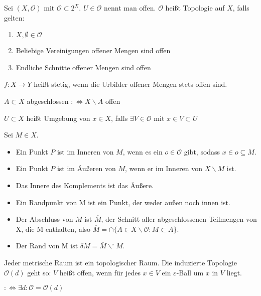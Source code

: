 \begin{defi}[Topologie]
  Sei $(X,\mathcal{O})$ mit $\mathcal{O} \subset 2^X$.
  $U \in \mathcal{O}$ nennt man offen.
  $\mathcal{O}$ heißt Topologie auf $X$, falls gelten:
  \begin{enumerate}
    \item $X, \emptyset \in \mathcal{O}$
    \item Beliebige Vereinigungen offener Mengen sind offen
    \item Endliche Schnitte offener Mengen sind offen
  \end{enumerate}
\end{defi}

\begin{defi}[Stetigkeit]
  $f:X\rightarrow Y$ heißt stetig, wenn die Urbilder offener Mengen stets offen sind.
\end{defi}

\begin{defi}[Abgeschlossen]
  $A \subset X$ abgeschlossen $:\Leftrightarrow X\backslash A$ offen
\end{defi}
\begin{defi}[Umgebung]
  $U \subset X$ heißt Umgebung von $x\in X$, falls
  $\exists V\in \mathcal{O}$ mit $x\in V \subset U$
\end{defi}
\begin{defi} Sei $M \in X$.
  \begin{itemize}
  	\item Ein Punkt $P$ ist im Inneren von $M$, wenn es ein $o \in \mathcal{O}$ gibt, sodass $x \in o \subseteq M$.
  	\item Ein Punkt $P$ ist im Äu{\ss}eren von $M$, wenn er im Inneren von $X \backslash M$ ist.
  	\item Das Innere des Komplements ist das {\"A}u{\ss}ere.
  	\item Ein Randpunkt von M ist ein Punkt, der weder au{\ss}en noch innen ist.
  	\item Der Abschluss von $M$ ist $\overline M$, der Schnitt aller abgeschlossenen Teilmengen von X, die M enthalten, also $\overline M = \cap \{ A \in X \backslash \mathcal{O}: M \subset A \}$.
  	\item Der Rand von M ist $\delta M = \overline M \backslash ^\circ M$.
  \end{itemize}
\end{defi}

\begin{defi}
  Jeder metrische Raum ist ein topologischer Raum.
  Die induzierte Topologie $\mathcal{O}(d)$ geht so: $V$ heißt offen,
  wenn für jedes $x\in V$ ein $\varepsilon$-Ball um $x$ in $V$ liegt.
\end{defi}
\begin{defi}
  $:\Leftrightarrow \exists d: \mathcal{O} = \mathcal{O}(d)$
\end{defi}

